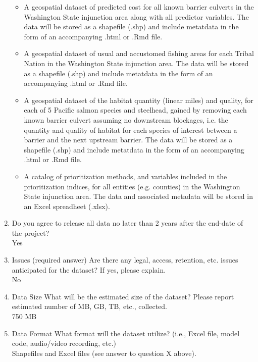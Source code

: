 \documentclass[12pt]{elsarticle}
\begin{document}
\begin{enumerate}
\begin{itemize}
\item A geospatial dataset of predicted cost for all known barrier culverts in the Washington State injunction area along with all predictor variables. The data will be stored as a shapefile (.shp) and include metatdata in the form of an accompanying .html or .Rmd file.
\item A geospatial dataset of usual and accustomed fishing areas for each Tribal Nation in the Washington State injunction area. The data will be stored as a shapefile (.shp) and include metatdata in the form of an accompanying .html or .Rmd file.
\item A geospatial dataset of the habitat quantity (linear miles) and quality, for each of 5 Pacific salmon species and steelhead, gained by removing each known barrier culvert assuming no downstream blockages, i.e. the quantity and quality of habitat for each species of interest between a barrier and the next upstream barrier. The data will be stored as a shapefile (.shp) and include metatdata in the form of an accompanying .html or .Rmd file.
\item A catalog of prioritization methods, and variables included in the prioritization indices, for all entities (e.g. counties) in the Washington State injunction area. The data and associated metadata will be stored in an Excel spreadheet (.xlsx).\\
\end{itemize}

\item		Do you agree to release all data no later than 2 years after the end-date of the project?\\
Yes\\

\item		Issues (required answer)
Are there any legal, access, retention, etc. issues anticipated for the dataset? If yes, please explain.\\
No\\

\item		Data Size
What will be the estimated size of the dataset? Please report estimated number of MB, GB, TB, etc., collected.\\
750 MB\\

\item		 Data Format
What format will the dataset utilize? (i.e., Excel file, model code, audio/video recording, etc.)\\
Shapefiles and Excel files (see answer to question X above).\\



\end{enumerate}
\end{document}

